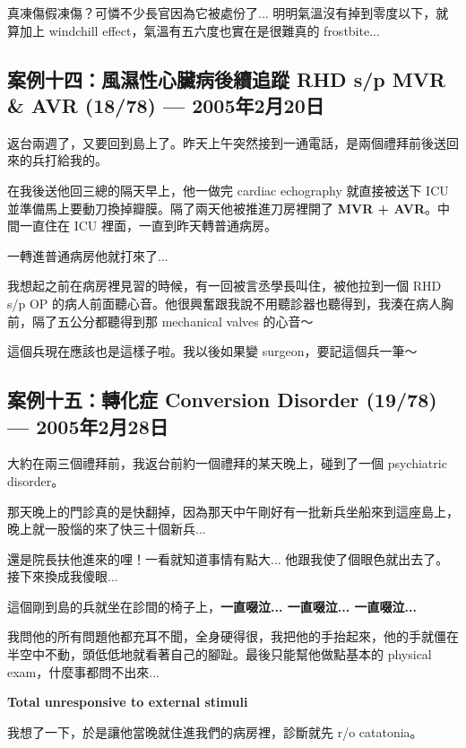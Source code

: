 \documentclass[12pt,a4paper]{article}
\newenvironment{myquote}{%
    \begin{tcolorbox}[
        colback=quote_bg,
        colframe=emergency_gray,
        boxrule=0pt,
        leftrule=3pt,
        arc=0pt,
        left=10pt,
        right=10pt,
        top=8pt,
        bottom=8pt
    ]
    \itshape
}{%
    \end{tcolorbox}
}
\begin{document}
\begin{myquote}
真凍傷假凍傷？可憐不少長官因為它被處份了... 明明氣溫沒有掉到零度以下，就算加上 windchill effect，氣溫有五六度也實在是很難真的 frostbite...
\end{myquote}

\subsection{案例十四：風濕性心臟病後續追蹤 RHD s/p MVR \& AVR (18/78) — 2005年2月20日}

返台兩週了，又要回到島上了。昨天上午突然接到一通電話，是兩個禮拜前後送回來的兵打給我的。

在我後送他回三總的隔天早上，他一做完 cardiac echography 就直接被送下 ICU 並準備馬上要動刀換掉瓣膜。隔了兩天他被推進刀房裡開了 \textbf{MVR + AVR}。中間一直住在 ICU 裡面，一直到昨天轉普通病房。

一轉進普通病房他就打來了...

我想起之前在病房裡見習的時候，有一回被言丞學長叫住，被他拉到一個 RHD s/p OP 的病人前面聽心音。他很興奮跟我說不用聽診器也聽得到，我湊在病人胸前，隔了五公分都聽得到那 mechanical valves 的心音～

\begin{myquote}
這個兵現在應該也是這樣子啦。我以後如果變 surgeon，要記這個兵一筆～
\end{myquote}

\subsection{案例十五：轉化症 Conversion Disorder (19/78) — 2005年2月28日}

大約在兩三個禮拜前，我返台前約一個禮拜的某天晚上，碰到了一個 psychiatric disorder。

那天晚上的門診真的是快翻掉，因為那天中午剛好有一批新兵坐船來到這座島上，晚上就一股惱的來了快三十個新兵...

還是院長扶他進來的哩！一看就知道事情有點大... 他跟我使了個眼色就出去了。接下來換成我傻眼...

這個剛到島的兵就坐在診間的椅子上，\textbf{一直啜泣... 一直啜泣... 一直啜泣...}

我問他的所有問題他都充耳不聞，全身硬得很，我把他的手抬起來，他的手就僵在半空中不動，頭低低地就看著自己的腳趾。最後只能幫他做點基本的 physical exam，什麼事都問不出來...

\textbf{Total unresponsive to external stimuli}

我想了一下，於是讓他當晚就住進我們的病房裡，診斷就先 r/o catatonia。
\end{document}
